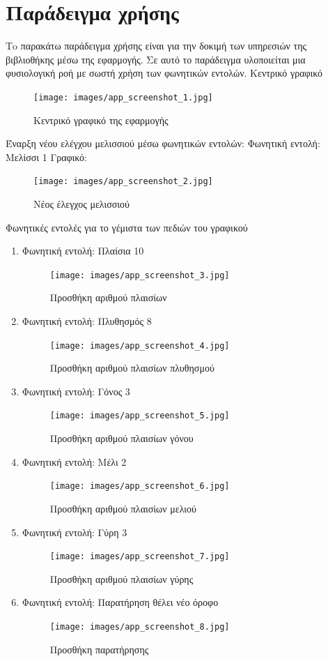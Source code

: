 \documentclass[oneside, 12pt]{book}
\begin{document}
\section{Παράδειγμα χρήσης}
Τo παρακάτω παράδειγμα χρήσης είναι για την δοκιμή των υπηρεσιών της βιβλιοθήκης μέσω της εφαρμογής. Σε αυτό το παράδειγμα υλοποιείται μια φυσιολογική ροή με σωστή χρήση των φωνητικών εντολών.
Κεντρικό γραφικό
\begin{figure}[H]
    \centering
    \texttt{[image: images/app\_screenshot\_1.jpg]}
    \caption{Κεντρικό γραφικό της εφαρμογής}
    \label{fig:myfigure}
\end{figure}
Έναρξη νέου ελέγχου μελισσιού μέσω φωνητικών εντολών:
\newline
Φωνητική εντολή: Μελίσσι 1
\newline
Γραφικό:
\begin{figure}[H]
    \centering
    \texttt{[image: images/app\_screenshot\_2.jpg]}
    \caption{Νέος έλεγχος μελισσιού}
    \label{fig:myfigure}
\end{figure}
\newpage
Φωνητικές εντολές για το γέμιστα των πεδιών του γραφικού
\begin{enumerate}
	\item Φωνητική εντολή: Πλαίσια 10
	\begin{figure}[H]
    	\centering
    	\texttt{[image: images/app\_screenshot\_3.jpg]}
    	\caption{Προσθήκη αριθμού πλαισίων}
	\end{figure}
	\newpage
	\item Φωνητική εντολή: Πλυθησμός 8
	\begin{figure}[H]
    	\centering
    	\texttt{[image: images/app\_screenshot\_4.jpg]}
    	\caption{Προσθήκη αριθμού πλαισίων πλυθησμού}
	\end{figure}
	\newpage
	\item Φωνητική εντολή: Γόνος 3
	\begin{figure}[H]
    	\centering
    	\texttt{[image: images/app\_screenshot\_5.jpg]}
    	\caption{Προσθήκη αριθμού πλαισίων γόνου}
	\end{figure}
	\newpage
	\item Φωνητική εντολή: Μέλι 2
	\begin{figure}[H]
    	\centering
    	\texttt{[image: images/app\_screenshot\_6.jpg]}
    	\caption{Προσθήκη αριθμού πλαισίων μελιού}
	\end{figure}
	\newpage
	\item Φωνητική εντολή: Γύρη 3
	\begin{figure}[H]
    	\centering
    	\texttt{[image: images/app\_screenshot\_7.jpg]}
    	\caption{Προσθήκη αριθμού πλαισίων γύρης}
	\end{figure}
	\newpage
	\item Φωνητική εντολή: Παρατήρηση θέλει νέο όροφο
	\begin{figure}[H]
    	\centering
    	\texttt{[image: images/app\_screenshot\_8.jpg]}
    	\caption{Προσθήκη παρατήρησης}
	\end{figure}
\end{enumerate}
\end{document}
